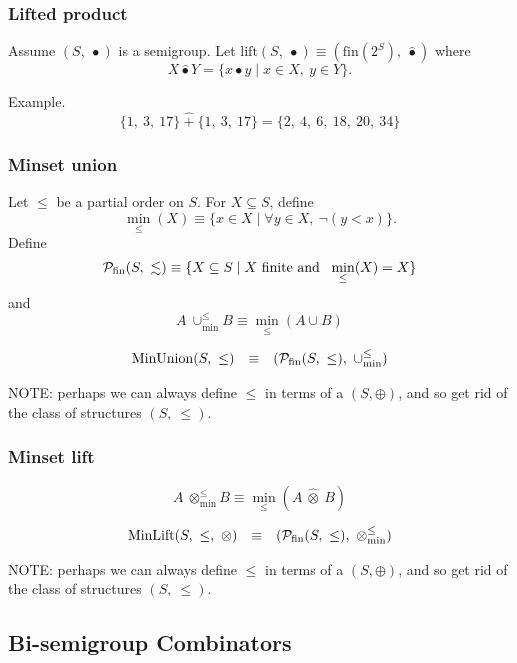 \documentclass[10pt]{article}
\newcommand{\minunion}{\cup_{\min}^{\leq}}
\newcommand{\minlift}{\otimes_{\min}^{\leq}}
\begin{document}
\subsubsection{Lifted product} 

Assume $(S,\ \bullet)$ is a semigroup. 
Let 
$\mathrm{lift}(S,\ \bullet) \equiv (\mathrm{fin}(2^S),\ \hat{\bullet})$ where 
\[ 
X \hat{\bullet} Y  = \{x \bullet y \mid x\in X,\ y\in Y\}. 
\]

Example. 
\[
    \{1,\ 3,\ 17\}\ \hat{+}\ \{1,\ 3,\ 17\} = \{2,\ 4,\ 6,\ 18,\ 20,\ 34\} 
\] 


\subsubsection{Minset union} 

Let $\leq$ be a partial order on $S$. 
For $X \subseteq S$, define 
\[
\min_\leq(X) \equiv \{x \in X \mid \forall y \in X,\  \neg(y < x)\}. 
\] 
Define 
\[
{\cal P}_{\mathrm{fin}}(S,\ \lesssim) 
   \equiv 
\{X \subseteq S\mid \mbox{$X$ finite and \ }\min_\leq(X) = X\} 
\] 
and 
\[
  A\ \minunion B  \equiv  \min_\leq(A\cup B) 
\] 

\[ 
\begin{array}{rcl} 
\mathrm{MinUnion}(S,\ \leq)
   & \equiv 
   & ({\cal P}_{\mathrm{fin}}(S,\ \leq),\ \minunion)
\end{array} 
\] 


NOTE: perhaps we can always define $\leq$ in terms of a $(S,\oplus)$, and so 
get rid of the class of structures $(S,\ \leq)$. 

\subsubsection{Minset lift} 

\[
  A\ \minlift B  \equiv   \min_\leq(A \ \hat{\otimes} \ B)
\] 

\[ 
\begin{array}{rcl} 
\mathrm{MinLift}(S,\ \leq,\ \otimes)
   & \equiv 
   & ({\cal P}_{\mathrm{fin}}(S,\ \leq),\ \minlift)
\end{array} 
\] 


NOTE: perhaps we can always define $\leq$ in terms of a $(S,\oplus)$, and so 
get rid of the class of structures $(S,\ \leq)$. 


\subsection{Bi-semigroup Combinators} 
\end{document}
